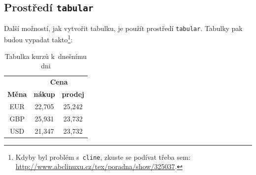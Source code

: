 \documentclass[a4paper, 11pt, a4paper]{article}
\begin{document}
\subsection{Prostředí \texttt{tabular}}

Další možností, jak vytvořit tabulku, je použít prostředí \texttt{tabular}. Tabulky pak budou vypadat takto\footnote{Kdyby byl problém s~\texttt{cline}, zkuste se podívat třeba sem: \href{http://www.abclinuxu.cz/tex/poradna/show/325037}{http://www.abclinuxu.cz/tex/poradna/show/325037}.}:

\vspace{1em}

\begin{table}[h]
    \centering
    \begin{tabular}{| c | c | c|} 
        \hline
        & \multicolumn{2}{c|}{\textbf{Cena}} \\ \cline{2-3} 
        \textbf{Měna} & \textbf{nákup} & \textbf{prodej} \\ \hline
        EUR & 22,705 & 25,242 \\
        GBP & 25,931 & 23,732 \\
        USD & 21,347 & 23,732 \\ \hline
    \end{tabular}
    \caption{Tabulka kurzů k~dnešnímu dni}
    \label{table:kurzy}
\end{table}

\vspace{2em}
\end{document}
